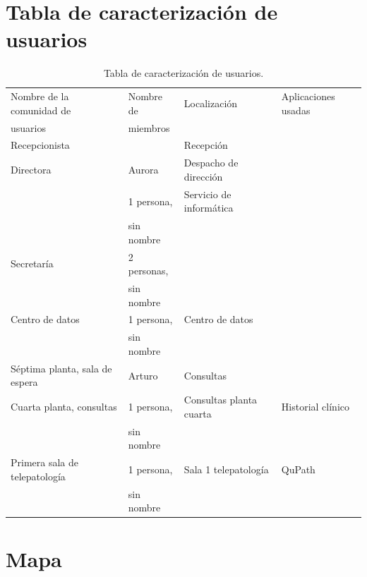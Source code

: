 \section{Tabla de caracterización de usuarios}

\begin{table}[H]
	\begin{center}
		\begin{tabular}{|l|l|l|l|}
			\hline 
			Nombre de la comunidad de & Nombre de & Localización & Aplicaciones usadas \\
		    usuarios & miembros & & \\ 
			\hline \hline
			Recepcionista & & Recepción  & \\ \hline
			Directora & Aurora & Despacho de dirección  & \\ \hline
			 & 1 persona, & Servicio de informática & \\ 
			 & sin nombre & & \\ \hline
		    Secretaría & 2 personas,  & &  \\ 
		     & sin nombre & & \\ \hline
		    Centro de datos & 1 persona, & Centro de datos &  \\ 
		     & sin nombre & & \\ \hline
		    Séptima planta, sala de espera & Arturo  & Consultas &  \\ \hline
		    Cuarta planta, consultas & 1 persona, & Consultas planta cuarta & Historial clínico  \\ 
		    & sin nombre & & \\ \hline
		    Primera sala de telepatología & 1 persona, & Sala 1 telepatología & QuPath \\
		    & sin nombre & & \\ \hline
		\end{tabular}
		\caption{Tabla de caracterización de usuarios.}
		\label{tabla:tabla5}
	\end{center}
\end{table}

\section{Mapa}

